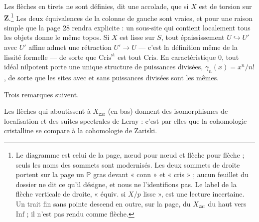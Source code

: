 \documentclass[11pt,a4paper]{article}
\begin{document}

Les flèches en tirets ne sont définies, dit une accolade, que si $X$ est de
torsion sur $\mathbf{Z}$.\footnote{Le diagramme est celui de la page, nœud
pour nœud et flèche pour flèche ; seuls les noms des sommets sont
modernisés. Les deux sommets de droite portent sur la page un $\mathbb{P}$
gras devant « conn » et « cris » ; aucun feuillet du dossier ne dit ce qu'il
désigne, et nous ne l'identifions pas. Le label de la flèche verticale de
droite, « équiv. si $X/p$ lisse », est une lecture incertaine. Un trait fin
sans pointe descend en outre, sur la page, du $X_{\mathrm{zar}}$ du haut vers
$\mathrm{Inf}$ ; il n'est pas rendu comme flèche.} Les deux équivalences de
la colonne de gauche sont vraies, et pour une raison simple que la page 28
rendra explicite : un sous-site qui contient localement tous les objets
donne le même topos. Si $X$ est lisse sur $S$, tout épaississement
$U \hookrightarrow U'$ avec $U'$ affine admet une rétraction $U' \to U$ — c'est
la définition même de la lissité formelle — de sorte que
$\mathrm{Cris}^{\mathrm{st}}$ est tout $\mathrm{Cris}$. En caractéristique
$0$, tout idéal nilpotent porte une unique structure de puissances divisées,
$\gamma_n(x) = x^{n}/n!$, de sorte que les sites avec et sans puissances
divisées sont les mêmes.

Trois remarques suivent.

Les flèches qui aboutissent à $X_{\mathrm{zar}}$ (en bas) donnent des
isomorphismes de localisation et des suites spectrales de Leray : c'est par
elles que la cohomologie cristalline se compare à la cohomologie de Zariski.
\end{document}
